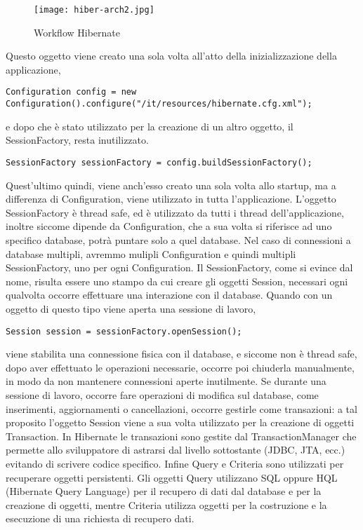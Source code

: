 \FloatBarrier
\begin{figure}[!htb]
\centering%
\texttt{[image: hiber-arch2.jpg]}%
\caption{Workflow Hibernate}\label{fig:hibernate2}%
\end{figure}

Questo oggetto viene creato una sola volta all'atto della inizializzazione della applicazione,

\begin{lstlisting}
Configuration config = new Configuration().configure("/it/resources/hibernate.cfg.xml");
\end{lstlisting}

e dopo che \`e stato utilizzato per la creazione di un altro oggetto, il SessionFactory, resta inutilizzato.

\begin{lstlisting}
SessionFactory sessionFactory = config.buildSessionFactory();
\end{lstlisting}

Quest'ultimo quindi, viene anch'esso creato una sola volta allo startup, ma a differenza di Configuration, viene utilizzato in tutta l'applicazione. L'oggetto SessionFactory \`e thread safe, ed \`e utilizzato da tutti i thread dell'applicazione, inoltre siccome dipende da Configuration, che a sua volta si riferisce ad uno specifico database, potr\`a puntare solo a quel database. Nel caso di connessioni a database multipli, avremmo mulipli Configuration e quindi multipli SessionFactory, uno per ogni Configuration.
Il SessionFactory, come si evince dal nome, risulta essere uno stampo da cui creare gli oggetti Session, necessari ogni qualvolta occorre effettuare una interazione con il database. Quando con un oggetto di questo tipo viene aperta una sessione di lavoro,

\begin{lstlisting}
Session session = sessionFactory.openSession();
\end{lstlisting}

viene stabilita una connessione fisica con il database, e siccome non \`e thread safe, dopo aver effettuato le operazioni necessarie, occorre poi chiuderla manualmente, in modo da non mantenere connessioni aperte inutilmente.
Se durante una sessione di lavoro, occorre fare operazioni di modifica sul database, come inserimenti, aggiornamenti o cancellazioni, occorre gestirle come transazioni: a tal proposito l'oggetto Session viene a sua volta utilizzato per la creazione di oggetti Transaction. 
In Hibernate le transazioni sono gestite dal TransactionManager che permette allo sviluppatore di astrarsi dal livello sottostante (JDBC, JTA, ecc.) evitando di scrivere codice specifico. Infine Query e Criteria sono utilizzati per recuperare oggetti persistenti. Gli oggetti Query utilizzano SQL oppure HQL (Hibernate Query Language) per il recupero di dati dal database e per la creazione di oggetti, mentre Criteria utilizza oggetti per la costruzione e la esecuzione di una richiesta di recupero dati. 
